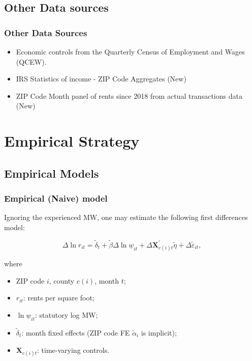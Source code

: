 \documentclass[aspectratio=169]{beamer}
\begin{document}
\subsection{Other Data sources}

\begin{frame}
	\frametitle{Other Data Sources} 
	
	\begin{itemize}
		\item Economic controls from the Quarterly Census of Employment and Wages 
		{\small (QCEW)}.
		\vspace{2mm}  \item IRS Statistics of income - ZIP Code Aggregates (New)
		\vspace{2mm} \item ZIP Code Month panel of rents since 2018 from actual transactions data (New)
	\end{itemize}
\end{frame}

\section{Empirical Strategy}

\subsection{Empirical Models}

\begin{frame}[label = stat_only_model]
	\frametitle{Empirical (Naive) model}
	
	Ignoring the experienced MW, one may estimate the following first differences model:
	
	$$
	\Delta \ln r_{it} = \tilde\delta_t + 
	\tilde\beta \Delta \ln \underline{w}_{it} + 
	\Delta \mathbf{X}^{'}_{c(i)t} \tilde\eta + 
	\Delta \tilde\varepsilon_{it} ,
	$$
	
	where	
	\begin{itemize} \small
	\item ZIP code $i$, county $c(i)$, month $t$;
	
	\item \vspace{1mm} $r_{it}$: rents per square foot;
	
	\item \vspace{1mm} $\ln \underline{w}_{it}$: statutory log MW;
	
	\item \vspace{1mm} $\tilde\delta_t$: month fixed effects (ZIP code FE $\tilde\alpha_i 
	$ is 
	implicit);
	
	\item \vspace{.5mm} $\mathbf{X}_{c(i)t}$: time-varying controls.
	\end{itemize}
\end{frame}
\end{document}
